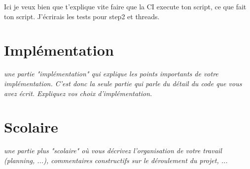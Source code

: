 \documentclass{article}
\begin{document}
Ici je veux bien que t'explique vite faire que la CI execute ton script, ce que fait ton script. J'écrirais les tests pour step2 et threads.


\section{Implémentation}
\textit{une partie "implémentation" qui explique les points importants de votre implémentation. C'est donc la seule partie qui parle du détail du code que vous avez écrit. Expliquez vos choix d'implémentation.
}
\vspace{5mm}

\section{Scolaire}
\textit{une partie plus "scolaire" où vous décrivez l'organisation de votre travail (planning, ...), commentaires constructifs sur le déroulement du projet, ...}
\vspace{5mm}
\end{document}
